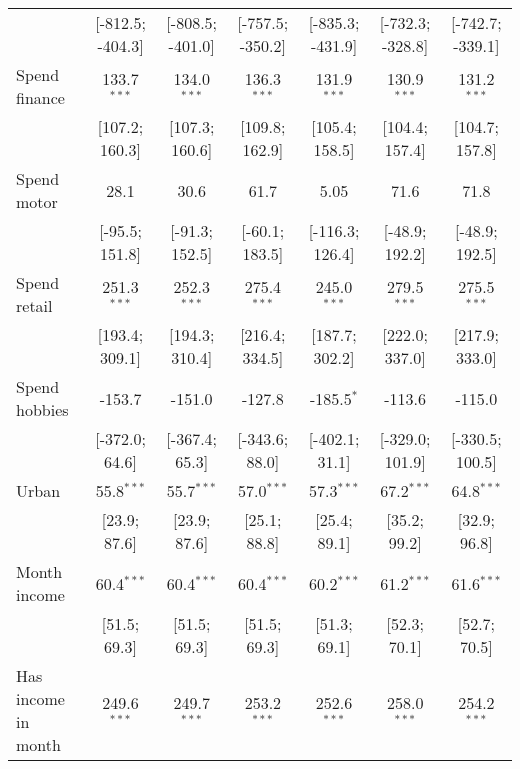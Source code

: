 \begin{table}[htbp]
\begin{threeparttable}[b]
\begin{tabular}{lcccccc}
                                   & [-812.5; -404.3] & [-808.5; -401.0] & [-757.5; -350.2] & [-835.3; -431.9] & [-732.3; -328.8] & [-742.7; -339.1]\\   
         Spend finance             & 133.7$^{***}$    & 134.0$^{***}$    & 136.3$^{***}$    & 131.9$^{***}$    & 130.9$^{***}$    & 131.2$^{***}$\\   
                                   & [107.2; 160.3]   & [107.3; 160.6]   & [109.8; 162.9]   & [105.4; 158.5]   & [104.4; 157.4]   & [104.7; 157.8]\\   
         Spend motor               & 28.1             & 30.6             & 61.7             & 5.05             & 71.6             & 71.8\\   
                                   & [-95.5; 151.8]   & [-91.3; 152.5]   & [-60.1; 183.5]   & [-116.3; 126.4]  & [-48.9; 192.2]   & [-48.9; 192.5]\\   
         Spend retail              & 251.3$^{***}$    & 252.3$^{***}$    & 275.4$^{***}$    & 245.0$^{***}$    & 279.5$^{***}$    & 275.5$^{***}$\\   
                                   & [193.4; 309.1]   & [194.3; 310.4]   & [216.4; 334.5]   & [187.7; 302.2]   & [222.0; 337.0]   & [217.9; 333.0]\\   
         Spend hobbies             & -153.7           & -151.0           & -127.8           & -185.5$^{*}$     & -113.6           & -115.0\\   
                                   & [-372.0; 64.6]   & [-367.4; 65.3]   & [-343.6; 88.0]   & [-402.1; 31.1]   & [-329.0; 101.9]  & [-330.5; 100.5]\\   
         Urban                     & 55.8$^{***}$     & 55.7$^{***}$     & 57.0$^{***}$     & 57.3$^{***}$     & 67.2$^{***}$     & 64.8$^{***}$\\   
                                   & [23.9; 87.6]     & [23.9; 87.6]     & [25.1; 88.8]     & [25.4; 89.1]     & [35.2; 99.2]     & [32.9; 96.8]\\   
         Month income              & 60.4$^{***}$     & 60.4$^{***}$     & 60.4$^{***}$     & 60.2$^{***}$     & 61.2$^{***}$     & 61.6$^{***}$\\   
                                   & [51.5; 69.3]     & [51.5; 69.3]     & [51.5; 69.3]     & [51.3; 69.1]     & [52.3; 70.1]     & [52.7; 70.5]\\   
         Has income in month       & 249.6$^{***}$    & 249.7$^{***}$    & 253.2$^{***}$    & 252.6$^{***}$    & 258.0$^{***}$    & 254.2$^{***}$\\   

\end{tabular}
\end{threeparttable}
\end{table}
